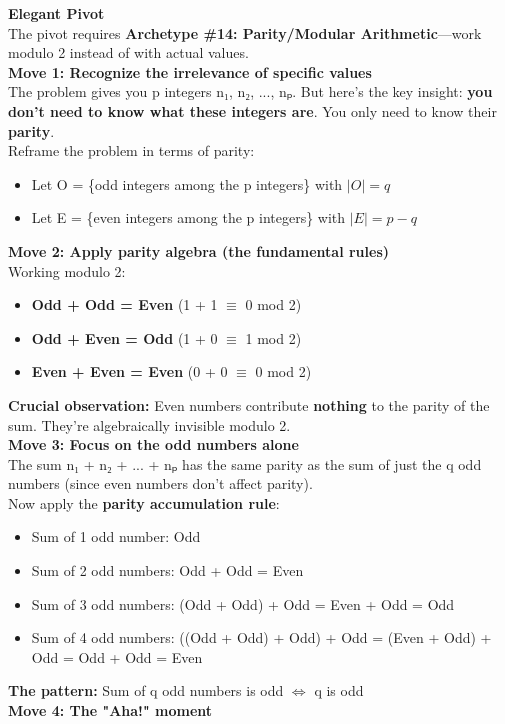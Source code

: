 \documentclass{article}
\begin{document}
\noindent \textbf{Elegant Pivot} \\
The pivot requires \textbf{Archetype \#14: Parity/Modular Arithmetic}—work modulo 2 instead of with actual values. \\
\textbf{Move 1: Recognize the irrelevance of specific values} \\
The problem gives you p integers n₁, n₂, ..., nₚ. But here's the key insight: \textbf{you don't need to know what these integers are}. You only need to know their \textbf{parity}. \\
Reframe the problem in terms of parity:
\begin{itemize}
    \item Let O = \{odd integers among the p integers\} with $|O| = q$
    \item Let E = \{even integers among the p integers\} with $|E| = p - q$
\end{itemize}
\textbf{Move 2: Apply parity algebra (the fundamental rules)} \\
Working modulo 2:
\begin{itemize}
    \item \textbf{Odd + Odd = Even} (1 + 1 $\equiv$ 0 mod 2)
    \item \textbf{Odd + Even = Odd} (1 + 0 $\equiv$ 1 mod 2)
    \item \textbf{Even + Even = Even} (0 + 0 $\equiv$ 0 mod 2)
\end{itemize}
\textbf{Crucial observation:} Even numbers contribute \textbf{nothing} to the parity of the sum. They're algebraically invisible modulo 2. \\
\textbf{Move 3: Focus on the odd numbers alone} \\
The sum n₁ + n₂ + ... + nₚ has the same parity as the sum of just the q odd numbers (since even numbers don't affect parity). \\
Now apply the \textbf{parity accumulation rule}:
\begin{itemize}
    \item Sum of 1 odd number: Odd
    \item Sum of 2 odd numbers: Odd + Odd = Even
    \item Sum of 3 odd numbers: (Odd + Odd) + Odd = Even + Odd = Odd
    \item Sum of 4 odd numbers: ((Odd + Odd) + Odd) + Odd = (Even + Odd) + Odd = Odd + Odd = Even
\end{itemize}
\textbf{The pattern:} Sum of q odd numbers is odd $\iff$ q is odd \\
\textbf{Move 4: The "Aha!" moment} \\
\end{document}
